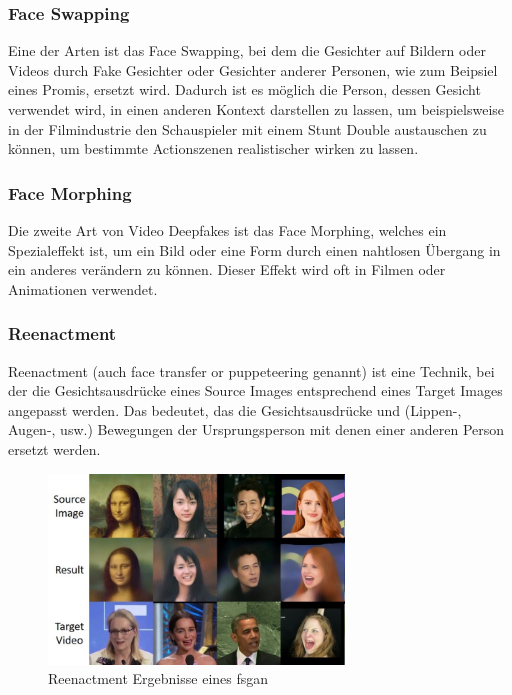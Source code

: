 \subsubsection{Face Swapping}
Eine der Arten ist das Face Swapping, bei dem die Gesichter auf Bildern oder Videos durch Fake Gesichter oder Gesichter anderer Personen, wie zum Beipsiel eines Promis, ersetzt wird.
Dadurch ist es möglich die Person, dessen Gesicht verwendet wird, in einen anderen Kontext darstellen zu lassen, um beispielsweise in der Filmindustrie den Schauspieler mit einem Stunt Double austauschen zu können, um bestimmte Actionszenen realistischer wirken zu lassen.\cite{ResearchGate}

\subsubsection{Face Morphing}
Die zweite Art von Video Deepfakes ist das Face Morphing, welches ein Spezialeffekt ist, um ein Bild oder eine Form durch einen nahtlosen Übergang in ein anderes verändern zu können. Dieser Effekt wird oft in Filmen oder Animationen verwendet.\cite{ResearchGate}

\subsubsection{Reenactment}
Reenactment (auch  face transfer or puppeteering genannt) ist eine Technik, bei der die Gesichtsausdrücke eines
Source Images entsprechend eines Target Images angepasst werden.
Das bedeutet, das die Gesichtsausdrücke und (Lippen-, Augen-, usw.) Bewegungen der Ursprungsperson mit denen einer
anderen Person ersetzt werden.
\begin{figure}[h]
    \includegraphics[width=0.7\textwidth]{Bilder/Reenactment}
    \centering
    \caption{Reenactment Ergebnisse eines \gls{fsgan}\cite{face-swapping-and-reenactment}}
    \label{fig:reenactment-fsgan}
\end{figure}

